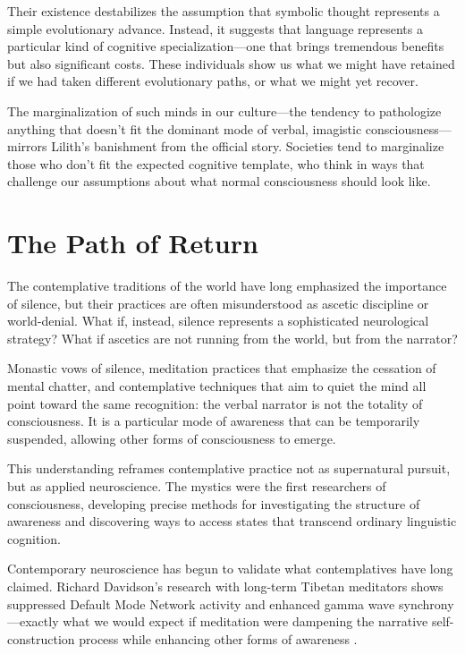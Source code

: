 Their existence destabilizes the assumption that symbolic thought represents a simple evolutionary advance. Instead, it suggests that language represents a particular kind of cognitive specialization—one that brings tremendous benefits but also significant costs. These individuals show us what we might have retained if we had taken different evolutionary paths, or what we might yet recover.

The marginalization of such minds in our culture—the tendency to pathologize anything that doesn't fit the dominant mode of verbal, imagistic consciousness—mirrors Lilith's banishment from the official story. Societies tend to marginalize those who don't fit the expected cognitive template, who think in ways that challenge our assumptions about what normal consciousness should look like.

\section{The Path of Return}

The contemplative traditions of the world have long emphasized the importance of silence, but their practices are often misunderstood as ascetic discipline or world-denial. What if, instead, silence represents a sophisticated neurological strategy? What if ascetics are not running from the world, but from the narrator?

Monastic vows of silence, meditation practices that emphasize the cessation of mental chatter, and contemplative techniques that aim to quiet the mind all point toward the same recognition: the verbal narrator is not the totality of consciousness. It is a particular mode of awareness that can be temporarily suspended, allowing other forms of consciousness to emerge.

This understanding reframes contemplative practice not as supernatural pursuit, but as applied neuroscience. The mystics were the first researchers of consciousness, developing precise methods for investigating the structure of awareness and discovering ways to access states that transcend ordinary linguistic cognition.

Contemporary neuroscience has begun to validate what contemplatives have long claimed. Richard Davidson's research with long-term Tibetan meditators shows suppressed Default Mode Network activity and enhanced gamma wave synchrony—exactly what we would expect if meditation were dampening the narrative self-construction process while enhancing other forms of awareness \parencite{davidson2003alterations}.

